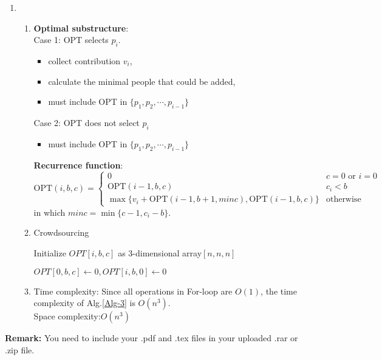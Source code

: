 \documentclass[12pt,a4paper,UTF8]{article}
\makeatletter
\newtheorem*{solution}{Solution}
\theoremstyle{definition}
\renewenvironment{solution}[1][Solution] {\par\pushQED{\qed}\normalfont\topsep6\p@\@plus6\p@\relax\trivlist\item[\hskip\labelsep\bfseries#1\@addpunct{.}]\ignorespaces}{\popQED\endtrivlist\@endpefalse} \makeatother
\makeatother
\begin{document}
\begin{enumerate}
	\begin{solution}
		\begin{enumerate}
			\item \textbf{Optimal substructure}:\\
			Case 1: OPT selects $ p_i $.
			\begin{itemize}
				\item collect contribution $ v_i $, 
				\item calculate the minimal people that could be added,
				\item must include OPT in $ \{p_1, p_2, \cdots, p_{i-1}\} $
			\end{itemize}
			Case 2: OPT does not select $ p_i $
			\begin{itemize}
				\item must include OPT in $ \{p_1, p_2, \cdots, p_{i-1}\} $
			\end{itemize}
			\textbf{Recurrence function}:
			$$\text{OPT}(i, b, c)= 
			\begin{cases}
			0 &c=0\text{ or }i=0\\
			\text{OPT}(i-1,b,c) &c_i<b\\
			\max \{v_i+\text{OPT}(i-1,b+1,minc),\text{OPT}(i-1,b,c)\} &\text{otherwise}
			\end{cases}
			$$
			in which $ minc=\min\{c-1,c_i-b\} $.
			\item
			\begin{minipage}[t]{0.89\textwidth}
				\begin{algorithm}[H]
					\BlankLine
					\caption{Crowdsourcing}
					\label{Alg-3}
					
					Initialize $ OPT[i,b,c] $ as 3-dimensional array$ [n,n,n] $\;
					
					$OPT[0,b,c]\leftarrow0,OPT[i,b,0]\leftarrow0 $\;
					
					
					\;
					
				\end{algorithm}
			\end{minipage}
			\item Time complexity: Since all operations in For-loop are $ O(1) $, the time complexity of Alg.\ref{Alg-3} is $ O(n^3) $.\\
			Space complexity:$  O(n^3) $
		\end{enumerate}
	\end{solution}

\end{enumerate}

\vspace{20pt}

\textbf{Remark:} You need to include your .pdf and .tex files in your uploaded .rar or .zip file.

\end{document}
